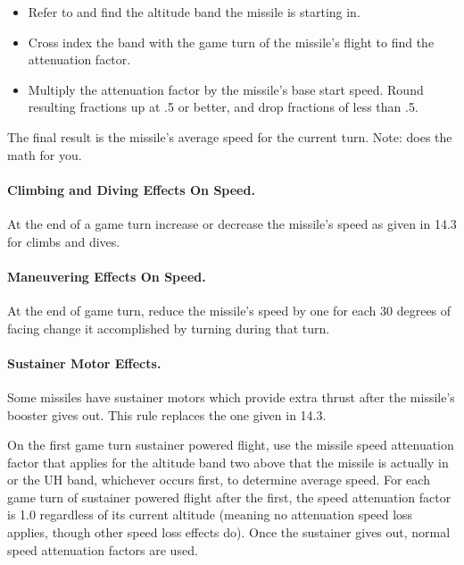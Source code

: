 \begin{advancedrules}
\begin{itemize}

    \item Refer to  and find the altitude band the missile is starting in.

    \item Cross index the band with the game turn of the missile's flight to find the attenuation factor.

    \item Multiply the attenuation factor by the missile's base start speed. Round resulting fractions up at .5 or better, and drop fractions of less than .5.

\end{itemize}

The final result is the missile's average speed for the current turn. Note:  does the math for you.

\paragraph{Climbing and Diving Effects On Speed.} At the end of a game turn increase or decrease the missile's speed as given in 14.3 for climbs and dives.

\paragraph{Maneuvering Effects On Speed.} At the end of game turn, reduce the missile's speed by one for each 30 degrees of facing change it accomplished by turning during that turn.

\paragraph{Sustainer Motor Effects.} Some missiles have sustainer motors which provide extra thrust after the missile's booster gives out. This rule replaces the one given in 14.3.

On the first game turn sustainer powered flight, use the missile speed attenuation factor that applies for the altitude band two above that the missile is actually in or the UH band, whichever occurs first, to determine average speed. For each game turn of sustainer powered flight after the first, the speed attenuation factor is 1.0 regardless of its current altitude (meaning no attenuation speed loss applies, though other speed loss effects do). Once the sustainer gives out, normal speed attenuation factors are used.


\end{advancedrules}
